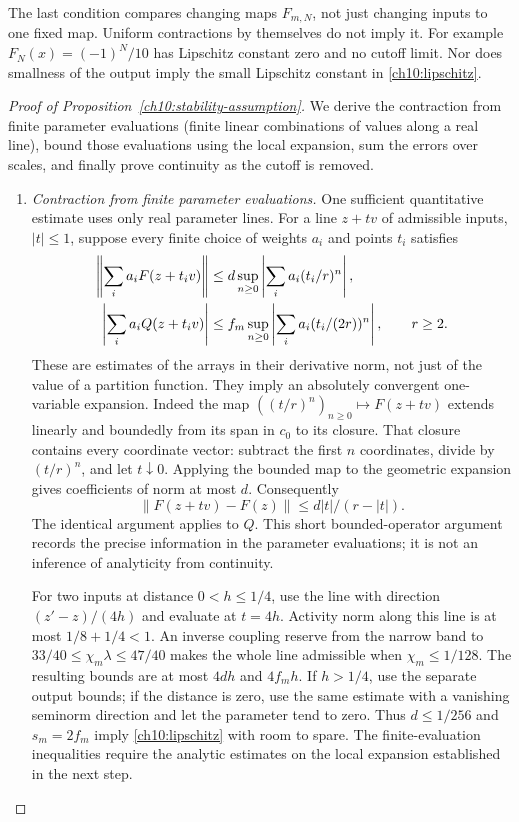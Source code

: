 The last condition compares changing maps $F_{m,N}$, not just changing
inputs to one fixed map. Uniform contractions by themselves do not
imply it. For example $F_N(x)=(-1)^N/10$ has Lipschitz constant zero
and no cutoff limit. Nor does smallness of the output imply the
small Lipschitz constant in \eqref{ch10:lipschitz}.

\begin{proof}[Proof of Proposition~\ref{ch10:stability-assumption}]
We derive the contraction from finite parameter evaluations (finite linear combinations of values along a real line), bound those
evaluations using the local expansion, sum the errors over scales, and
finally prove continuity as the cutoff is removed.

\begin{enumerate}[label=\emph{Step \arabic*.},ref=\arabic*,leftmargin=*,align=left]
\item \emph{Contraction from finite parameter evaluations.}
One sufficient quantitative estimate uses only real parameter lines.
For a line $z+tv$ of admissible inputs, $|t|\le1$, suppose every finite
choice of weights $a_i$ and points $t_i$ satisfies
\begin{align}\label{ch10:finite-tests}
 \left\|\sum_i a_i F(z+t_i v)\right\|
 &\le d\sup_{n\ge0}\left|\sum_i a_i(t_i/r)^n\right|,\\
 \left|\sum_i a_i Q(z+t_i v)\right|
 &\le f_m\sup_{n\ge0}\left|\sum_i a_i(t_i/(2r))^n\right|,
 \qquad r\ge2.\notag
\end{align}
These are estimates of the arrays in their derivative norm,
not just of the value of a partition function. They imply an
absolutely convergent one-variable expansion. Indeed the map
$((t/r)^n)_{n\ge0}\mapsto F(z+tv)$ extends linearly and boundedly
from its span in $c_0$ to its closure. That closure contains every
coordinate vector: subtract the first $n$ coordinates, divide by
$(t/r)^n$, and let $t\downarrow0$. Applying the bounded map to the
geometric expansion gives coefficients of norm at most $d$.
Consequently
\[
 \|F(z+tv)-F(z)\|\le d|t|/(r-|t|).
\]
The identical argument applies to $Q$. This short bounded-operator
argument records the precise information in the parameter evaluations; it is not an
inference of analyticity from continuity.

For two inputs at distance $0<h\le1/4$, use the line with direction
$(z'-z)/(4h)$ and evaluate at $t=4h$. Activity norm along this line
is at most $1/8+1/4<1$. An inverse coupling reserve from the narrow band to
$33/40\le\chi_m\lambda\le47/40$ makes the whole line admissible
when $\chi_m\le1/128$. The resulting bounds are at most $4dh$ and
$4f_mh$. If $h>1/4$, use the separate output bounds; if the distance
is zero, use the same estimate with a vanishing seminorm direction
and let the parameter tend to zero. Thus $d\le1/256$ and
$s_m=2f_m$ imply \eqref{ch10:lipschitz} with room to spare.
The finite-evaluation inequalities require the analytic estimates on the
local expansion established in the next step.


\end{enumerate}
\end{proof}
